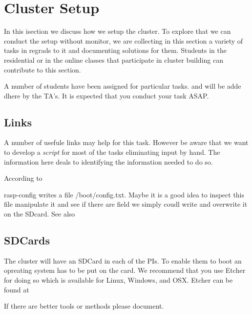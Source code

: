 \chapter{Cluster Setup}

In this isection we discuss how we setup the cluster. To explore that
we can conduct the setup without monitor, we are collecting in this
section a variety of tasks in regrads to it and documenting solutions
for them. Students in the residential or in the online classes that
participate in cluster building can contribute to this section.

A number of students have been assigned for particular tasks. and will
be adde dhere by the TA's. It is expected that you conduct your task ASAP.

\section{Links}

A number of usefule links may help for this task. However be aware
that we want to develop a \textit{script} for most of the tasks
eliminating input by hand. The information here deals to identifying
the information needed to do so.



According to 


rasp-config writes a file /boot/config.txt. Maybe it is a good idea to
inspect this file manipulate it and see if there are field we simply
coudl write and overwrite it on the SDcard. See also 



\section{SDCards}

The cluster will have an SDCard in each of the PIs. To enable them to
boot an opreating system has to be put on the card. We recommend that
you use Etcher for doing so which is available for Linux, Windows, and
OSX. Etcher can be found at 

If there are better tools or methods please document.

